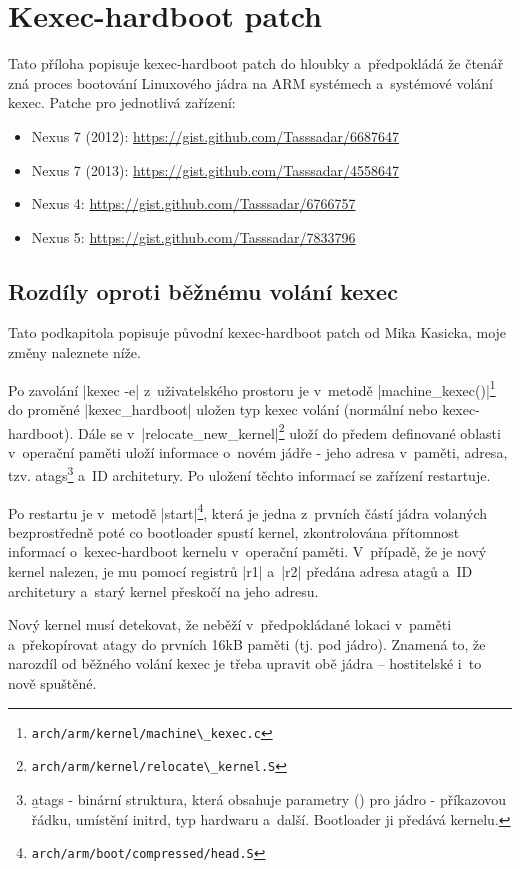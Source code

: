 \documentclass[12pt, a4paper, oneside]{article}
\begin{document}
\section*{Kexec-hardboot patch}
\label{sec:kexec-hardboot}
Tato příloha popisuje kexec-hardboot patch do hloubky a~předpokládá že čtenář zná proces bootování Linuxového jádra na ARM systémech a~systémové volání kexec. Patche pro jednotlivá zařízení:
\begin{itemize}
    \item Nexus 7 (2012): \url{https://gist.github.com/Tasssadar/6687647}
    \item Nexus 7 (2013): \url{https://gist.github.com/Tasssadar/4558647}
    \item Nexus 4: \url{https://gist.github.com/Tasssadar/6766757}
    \item Nexus 5: \url{https://gist.github.com/Tasssadar/7833796}
\end{itemize}

\subsection*{Rozdíly oproti běžnému volání kexec}
Tato podkapitola popisuje původní kexec-hardboot patch od Mika Kasicka, moje změny naleznete níže.

Po zavolání |kexec -e| z~uživatelského prostoru je v~metodě |machine_kexec()|\footnote{\verb-arch/arm/kernel/machine\_kexec.c-} do proměné |kexec_hardboot| uložen typ kexec volání (normální nebo kexec-hardboot). Dále se v~|relocate_new_kernel|\footnote{\verb-arch/arm/kernel/relocate\_kernel.S-} uloží do předem definované oblasti v~operační paměti uloží informace o~novém jádře - jeho adresa v~paměti, adresa, tzv. atags\footnote{\b{atags} - binární struktura, která obsahuje parametry () pro jádro - příkazovou řádku, umístění initrd, typ hardwaru a~další. Bootloader ji předává kernelu.} a~ID architetury. Po uložení těchto informací se zařízení restartuje.

Po restartu je v~metodě |start|\footnote{\verb-arch/arm/boot/compressed/head.S-}, která je jedna z~prvních částí jádra volaných bezprostředně poté co bootloader spustí kernel, zkontrolována přítomnost informací o~kexec-hardboot kernelu v~operační paměti. V~případě, že je nový kernel nalezen, je mu pomocí registrů |r1| a~|r2| předána adresa atagů a~ID architetury a~starý kernel přeskočí na jeho adresu.

Nový kernel musí detekovat, že neběží v~předpokládané lokaci v~paměti a~překopírovat atagy do prvních 16kB paměti (tj. pod jádro). Znamená to, že narozdíl od běžného volání kexec je třeba upravit obě jádra -- hostitelské i~to nově spuštěné.
\end{document}
